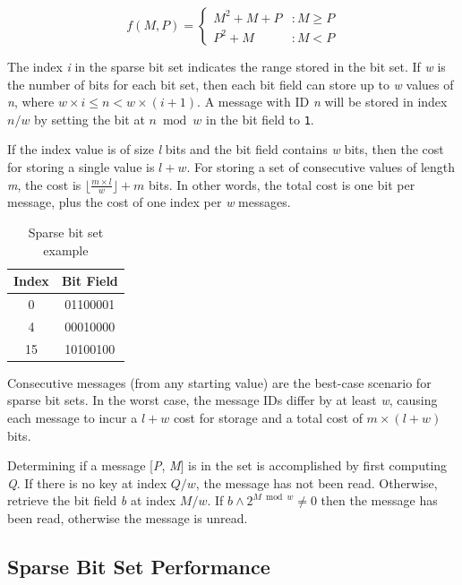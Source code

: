 \begin{equation}
   f(M,P) = \left\{
     \begin{array}{lr}
       M^{2} + M + P & : M \geq P \\
       P^{2} + M & : M < P
     \end{array}
   \right.
   \label{eq:elegantpairing}
\end{equation}

The index \textit{i} in the sparse bit set indicates the range stored in the bit set. If \textit{w} is the number of bits for each bit set, then each bit field can store up to \textit{w} values of \textit{n}, where $w \times i \leq n < w \times (i + 1)$. A message with ID \textit{n} will be stored in index $n/w$ by setting the bit at $n \bmod w$ in the bit field to \texttt{1}.

If the index value is of size \textit{l} bits and the bit field contains \textit{w} bits, then the cost for storing a single value is $l + w$. For storing a set of consecutive values of length \textit{m}, the cost is $\lfloor \frac{m \times l}{w} \rfloor + m$ bits. In other words, the total cost is one bit per message, plus the cost of one index per \textit{w} messages.

\begin{table}
\centering
\caption{Sparse bit set example}
\begin{tabular}{|c|c|} \hline
Index & Bit Field \\ \hline
0 & 01100001 \\ \hline
4 & 00010000 \\ \hline
15 & 10100100 \\ \hline
\end{tabular}
\label{fig:bitset}
\end{table}

Consecutive messages (from any starting value) are the best-case scenario for sparse bit sets. In the worst case, the message IDs differ by at least \textit{w}, causing each message to incur a $l + w$ cost for storage and a total cost of $m \times (l + w)$ bits.

Determining if a message [\textit{P}, \textit{M}] is in the set is accomplished by first computing \textit{Q}. If there is no key at index $Q/w$, the message has not been read. Otherwise, retrieve the bit field \textit{b} at index $M / w$. If $b \wedge 2^{M \bmod w} \neq 0$ then the message has been read, otherwise the message is unread.

\subsection{Sparse Bit Set Performance}

